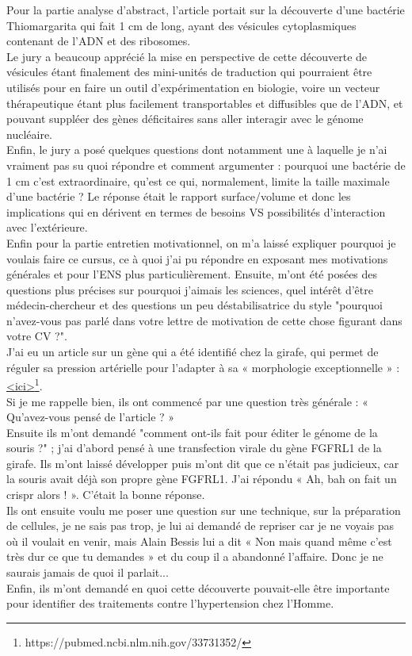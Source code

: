 \lettrine{{\color{yellow!80!black} \oldpilcrowfive}}{}
Pour la partie analyse d’abstract, l’article portait sur la découverte d’une bactérie Thiomargarita qui fait 1 cm de long, ayant des vésicules cytoplasmiques contenant de l’ADN et des ribosomes.\\
Le jury a beaucoup apprécié la mise en perspective de cette découverte de vésicules étant finalement des mini-unités de traduction qui pourraient être utilisés pour en faire un outil d’expérimentation en biologie, voire un vecteur thérapeutique étant plus facilement transportables et diffusibles que de l’ADN, et pouvant suppléer des gènes déficitaires sans aller interagir avec le génome nucléaire.\\
Enfin, le jury a posé quelques questions dont notamment une à laquelle je n’ai vraiment pas su quoi répondre et comment argumenter : pourquoi une bactérie de 1 cm c’est extraordinaire, qu’est ce qui, normalement, limite la taille maximale d’une bactérie ? Le réponse était le rapport surface/volume et donc les implications qui en dérivent en termes de besoins VS possibilités d’interaction avec l’extérieure.\\
Enfin pour la partie entretien motivationnel, on m’a laissé expliquer pourquoi je voulais faire ce cursus, ce à quoi j’ai pu répondre en exposant mes motivations générales et pour l’ENS plus particulièrement. Ensuite, m’ont été posées des questions plus précises sur pourquoi j’aimais les sciences, quel intérêt d’être médecin-chercheur et des questions un peu déstabilisatrice du style "pourquoi n’avez-vous pas parlé dans votre lettre de motivation de cette chose figurant dans votre CV ?".\\

\lettrine{{\color{violet} \oldpilcrowfive}}{}
J’ai eu un article sur un gène qui a été identifié chez la girafe, qui permet de réguler sa pression artérielle pour l’adapter à sa « morphologie exceptionnelle » : \href{https://pubmed.ncbi.nlm.nih.gov/33731352/}{<ici>}\footnote{https://pubmed.ncbi.nlm.nih.gov/33731352/}.\\
Si je me rappelle bien, ils ont commencé par une question très générale : « Qu’avez-vous pensé de l’article ? »\\
Ensuite ils m’ont demandé "comment ont-ils fait pour éditer le génome de la souris ?" ; j’ai d’abord pensé à une transfection virale du gène FGFRL1 de la girafe. Ils m’ont laissé développer puis m’ont dit que ce n’était pas judicieux, car la souris avait déjà son propre gène FGFRL1. J’ai répondu « Ah, bah on fait un crispr alors ! ». C’était la bonne réponse.\\
Ils ont ensuite voulu me poser une question sur une technique, sur la préparation de cellules, je ne sais pas trop, je lui ai demandé de repriser car je ne voyais pas où il voulait en venir, mais Alain Bessis lui a dit « Non mais quand même c’est très dur ce que tu demandes » et du coup il a abandonné l’affaire. Donc je ne saurais jamais de quoi il parlait...\\
Enfin, ils m’ont demandé en quoi cette découverte pouvait-elle être importante pour identifier des traitements contre l’hypertension chez l’Homme.\\

